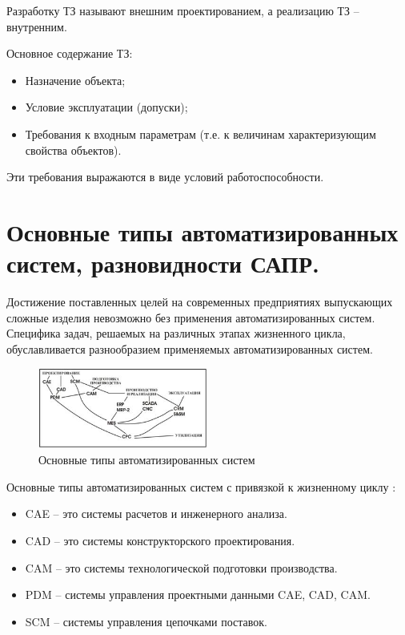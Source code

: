 \documentclass[unicode, 12pt, a4paper, oneside]{article}
\begin{document}
Разработку ТЗ называют внешним проектированием, а реализацию ТЗ – внутренним.

Основное содержание ТЗ:

\begin{itemize}
\item Назначение объекта;
\item Условие эксплуатации (допуски);
\item Требования к входным параметрам (т.е. к величинам характеризующим свойства объектов).
\end{itemize}

Эти требования выражаются в виде условий работоспособности.

\section{Основные типы автоматизированных систем, разновидности САПР.}

Достижение поставленных целей на современных предприятиях выпускающих сложные изделия невозможно без применения автоматизированных систем. Специфика задач, решаемых на различных этапах жизненного цикла, обуславливается разнообразием применяемых автоматизированных систем.

\begin{figure}[H]
\centering
\includegraphics[width=0.5\textwidth]{124.jpg}
\caption{Основные типы автоматизированных систем}
\end{figure}

Основные типы автоматизированных систем с привязкой к жизненному циклу :

\begin{itemize}
\item CAE – это системы расчетов и инженерного анализа.
\item CAD – это системы конструкторского проектирования.
\item CAM – это системы технологической подготовки производства.
\item PDM – системы управления проектными данными CAE, CAD, CAM.
\item SCM – системы управления цепочками поставок.
\end{itemize}
\end{document}
